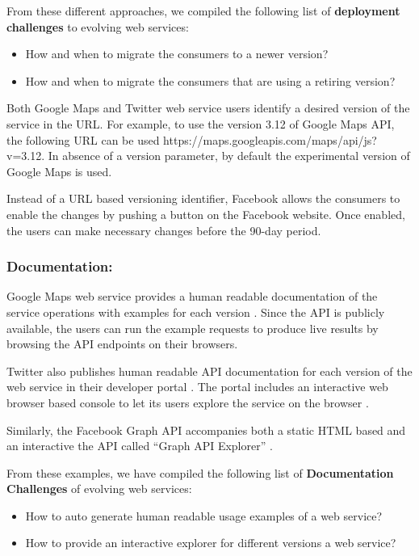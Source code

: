 \documentclass[runningheads,a4paper]{llncs}
\begin{document}
From these different approaches, we compiled the following list of \textbf{deployment challenges} to evolving web services:

\begin{itemize}
  \item How and when to migrate the consumers to a newer version?
  \item How and when to migrate the consumers that are using a retiring version?
\end{itemize}

Both Google Maps and Twitter web service users identify a desired version of the service in the URL. For example, to use the version 3.12 of Google Maps API, the following URL can be used https://maps.googleapis.com/maps/api/js?v=3.12. In absence of a version parameter, by default the experimental version of Google Maps is used.

Instead of a URL based versioning identifier, Facebook allows the consumers to enable the changes by pushing a button on the Facebook website. Once enabled, the users can make necessary changes before the 90-day period.

\subsubsection{Documentation:}
Google Maps web service provides a human readable documentation of the service operations with examples for each version \cite{google_maps_services}. Since the API is publicly available, the users can run the example requests to produce live results by browsing the API endpoints on their browsers.

Twitter also publishes human readable API documentation for each version of the web service in their developer portal \cite{twitter_api}. The portal includes an interactive web browser based console to let its users explore the service on the browser \cite{twitter_console}.

Similarly, the Facebook Graph API accompanies both a static HTML based and an interactive the API called ``Graph API Explorer'' \cite{facebook_api}.

From these examples, we have compiled the following list of \textbf{Documentation Challenges} of evolving web services:

\begin{itemize}
  \item How to auto generate human readable usage examples of a web service?
  \item How to provide an interactive explorer for different versions a web service?
\end{itemize}
\end{document}
